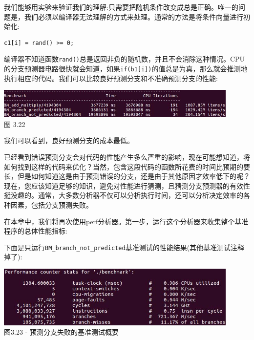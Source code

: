 我们能够用实验来验证我们的理解:只需要把随机条件改变成总是正确。唯一的问题是，我们必须以编译器无法理解的方式来处理。通常的方法是将条件向量进行初始化:

\begin{lstlisting}[style=styleCXX]
c1[i] = rand() >= 0;
\end{lstlisting}

编译器不知道函数\texttt{rand()}总是返回非负的随机数，并且不会消除这种情况。CPU的分支预测器电路很快就会知道，如果\texttt{if(b1[i])}的值总是为真，那么就会推测地执行相应的代码。我们可以比较良好预测分支和不准确预测分支的性能:

\begin{center}
\includegraphics[width=0.9\textwidth]{content/1/chapter3/images/22.jpg}\\
图 3.22
\end{center}

我们可以看到，良好预测分支的成本最低。


已经看到错误预测分支会对代码的性能产生多么严重的影响，现在可能想知道，将如何找到这样的代码来优化？当然，包含这段代码的函数所花费的时间比预期的要长，但是如何知道这是由于预测错误的分支，还是由于其他原因才效率低下的呢？现在，您应该知道足够的知识，避免对性能进行猜测，且猜测分支预测器的有效性挺没趣的。通常，大多数分析器不仅可以分析执行时间，还可以分析决定效率的各种因素，包括分支预测失败。

在本章中，我们将再次使用perf分析器。第一步，运行这个分析器来收集整个基准程序的总体性能指标:


下面是只运行\texttt{BM\_branch\_not\_predicted}基准测试的性能结果(其他基准测试注释掉了):

\begin{center}
\includegraphics[width=0.9\textwidth]{content/1/chapter3/images/23.jpg}\\
图3.23 - 预测分支失败的基准测试概要
\end{center}

